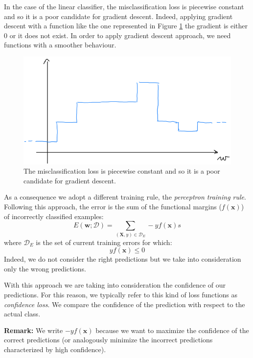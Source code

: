 In the case of the linear classifier, the misclassification loss is piecewise constant and so it is a poor candidate for gradient descent. Indeed, applying gradient descent with a function like the one represented in Figure \ref{fig:scalini} the gradient is either 0 or it does not exist. In order to apply gradient descent approach, we need functions with a smoother behaviour. 
\begin{figure}[H]
    \centering
    \includegraphics[width=\textwidth]{images/gradini.png}
    \caption{The misclassification loss is piecewise constant and so it is a poor candidate for gradient descent.}
    \label{fig:scalini}
\end{figure}
As a consequence we adopt a different training rule, the \textit{perceptron training rule}. Following this approach, the error is the sum of the functional margins ($f(\pmb{x})$) of incorrectly classified examples:
\begin{equation}
    \label{perceptronTrainingRule1}
    E(\pmb{w}; \mathcal{D}) = \sum_{(\pmb{X},y) \in \mathcal{D}_E} -y f(\pmb{x})s
\end{equation}
where $\mathcal{D}_E$ is the set of current training errors for which:
$$y f(\pmb{x}) \leq 0$$
Indeed, we do not consider the right predictions but we take into consideration only the wrong predictions. \newline

With this approach we are taking into consideration the confidence of our predictions. For this reason, we typically refer to this kind of loss functions as \textit{confidence loss}. We compare the confidence of the prediction with respect to the actual class. \newline

\textbf{Remark:} We write $ - y f(\pmb{x})$ because we want to maximize the confidence of the correct predictions (or analogously minimize the incorrect predictions characterized by high confidence). \newline



